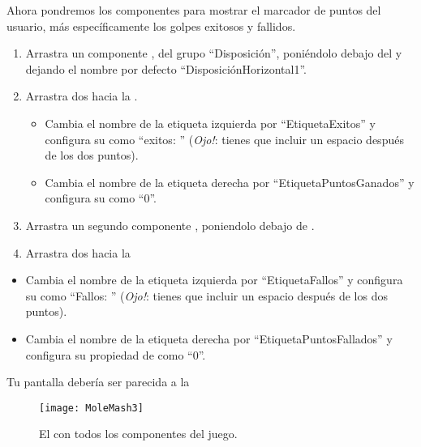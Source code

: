 Ahora pondremos los componentes para mostrar el marcador de puntos del
usuario, más específicamente los golpes exitosos y fallidos.

\begin{enumerate}

\item Arrastra un componente , del
  grupo ``Disposición'', poniéndolo debajo del
   y dejando el nombre por defecto
  ``DisposiciónHorizontal1''.

\item Arrastra dos  hacia la
  .

  \begin{itemize}
  \item Cambia el nombre de la etiqueta izquierda por
    ``EtiquetaExitos'' y configura su  como ``exitos:
    '' (\emph{Ojo!}: tienes que incluir un espacio después de los dos
    puntos).

\item Cambia el nombre de la etiqueta derecha por
  ``EtiquetaPuntosGanados'' y configura su  como
  ``0''.
  \end{itemize}

\item Arrastra un segundo componente
  , poniendolo debajo de
  .

\item Arrastra dos  hacia la
\end{enumerate}

\begin{itemize}
\item Cambia el nombre de la etiqueta izquierda por ``EtiquetaFallos''
  y configura su  como ``Fallos: '' (\emph{Ojo!}:
  tienes que incluir un espacio después de los dos puntos).

\item Cambia el nombre de la etiqueta derecha por
  ``EtiquetaPuntosFallados'' y configura su propiedad de
   como ``0''.
\end{itemize}

Tu pantalla debería ser parecida a la~

\begin{figure}[H]
\centering
\texttt{[image: MoleMash3]}
\caption{El \designer con todos los componentes del juego.}
\label{fig:MoleMash3}
\end{figure}

